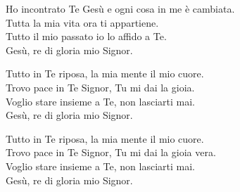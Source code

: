
\strofa Ho incontrato Te Gesù e ogni cosa in me è cambiata.\\
Tutta la mia vita ora ti appartiene.\\
Tutto il mio passato io lo affido a Te.\\
Gesù, re di gloria mio Signor.

\spazio

Tutto in Te riposa, la mia mente il mio cuore.\\
Trovo pace in Te Signor, Tu mi dai la gioia.\\
Voglio stare insieme a Te, non lasciarti mai.\\
Gesù, re di gloria mio Signor.

\spazio


\spazio

Tutto in Te riposa, la mia mente il mio cuore.\\
Trovo pace in Te Signor, Tu mi dai la gioia vera.\\
Voglio stare insieme a Te, non lasciarti mai.\\
Gesù, re di gloria mio Signor.

\spazio

